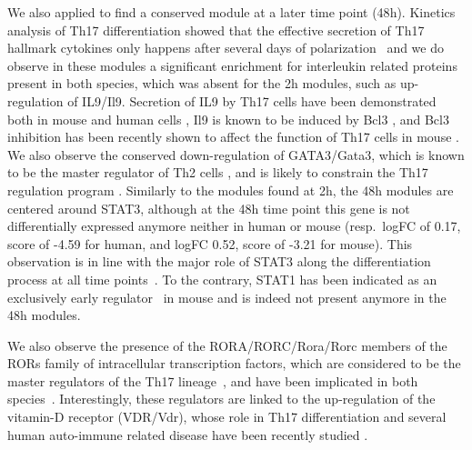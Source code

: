 We also applied \xheinz{} to find a conserved module at a later time point (\unit{48}{h}).
Kinetics analysis of Th17 differentiation showed that the effective secretion of Th17 hallmark cytokines only happens after several days of polarization~\parencites{tuomela2012identification,yosef2013dynamic} and we do observe in these modules a significant enrichment for interleukin related proteins present in both species, which was absent for the \unit{2}{h} modules, such as up-regulation of IL9/Il9.
Secretion of IL9 by Th17 cells have been demonstrated both in mouse and human cells \parencite{beriou2010tgf}, Il9 is known to be induced by Bcl3 \parencite{richard1999interleukin}, and Bcl3 inhibition has been recently shown to affect the function of Th17 cells in mouse \parencite{ruan2010roles}.
We also observe the conserved down-regulation of GATA3/Gata3, which is known to be the master regulator of Th2 cells \parencite{zheng1997transcription}, and is likely to constrain the Th17 regulation program \parencite{van2008enforced}.
Similarly to the modules found at \unit{2}{h}, the \unit{48}{h} modules are centered around STAT3, although at the \unit{48}{h} time point this gene is not differentially expressed anymore neither in human or mouse (resp.\ logFC of 0.17, score of -4.59 for human, and logFC 0.52, score of -3.21 for mouse).
This observation is in line with the major role of STAT3 along the differentiation process at all time points~\parencite{yosef2013dynamic}.
To the contrary, STAT1 has been indicated as an exclusively early regulator~\parencite{yosef2013dynamic} in mouse and is indeed not present anymore in the \unit{48}{h} modules.%

We also observe the presence of the RORA/RORC/Rora/Rorc members of the RORs family of intracellular transcription factors, which are considered to be the master regulators of the Th17 lineage~\parencite{yang2008t}, and have been implicated in both species~\parencite{crome2009role}.
Interestingly, these regulators are linked to the up-regulation of the vitamin-D receptor (VDR/Vdr), whose role in Th17 differentiation and several human auto-immune related disease have been recently studied \parencite{chang2010vitamin}.


